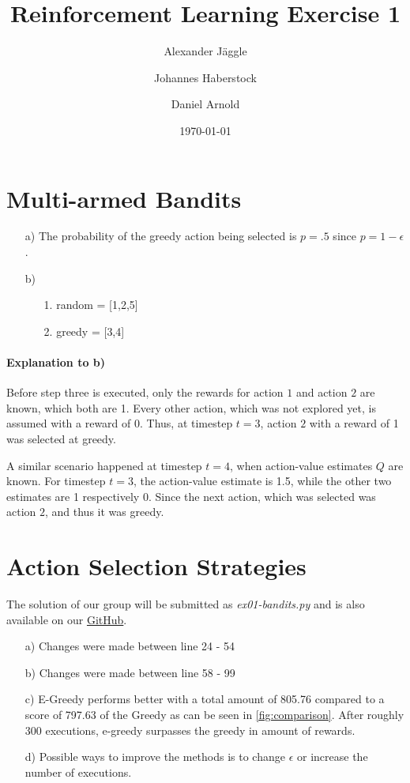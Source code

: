 \documentclass{article}
\title{Reinforcement Learning Exercise 1}
\author{Alexander J\"aggle}
\author{Johannes Haberstock}
\author{Daniel Arnold}
\affil{M.Sc. Autonomous Systems, University of Stuttgart}
\date{\today}
\begin{document}
\maketitle

\section{Multi-armed Bandits}

\begin{itemize}
    \item[a)] The probability of the greedy action being selected is $p = .5$ since $p = 1- \epsilon$.   
    \item[b)] {
    \begin{itemize}
        \item[1.] random = [{1,2,5}]
        \item[2.] greedy = [{3,4}]
    \end{itemize}
    }
\end{itemize}


\paragraph{Explanation to b)}
Before step three is executed, only the rewards for action $1$ and action $2$ are known, which both are 1. 
Every other action, which was not explored yet, is assumed with a reward of 0. Thus, at timestep $t = 3$, 
action $2$ with a reward of 1 was selected at greedy. 

A similar scenario happened at timestep $t = 4$, when action-value estimates $Q$ are known. For timestep $t = 3$,
the action-value estimate is 1.5, while the other two estimates are 1 respectively 0. Since the next action, which
was selected was action $2$, and thus it was greedy. 

\section{Action Selection Strategies}
The solution of our group will be submitted as \textit{ex01-bandits.py} and is also available on our 
\href{https://github.com/DesmoAlex/ReinforcementLearning_UniStgt/tree/master/ex01-bandits}{GitHub}.

\begin{itemize}
    \item[a)] Changes were made between line 24 - 54 
    \item[b)] Changes were made between line 58 - 99
    \item[c)] E-Greedy performs better with a total amount of 805.76 compared to a score of 797.63
                of the Greedy as can be seen in \cref{fig:comparison}. After roughly 300 executions, e-greedy surpasses the greedy in amount of
                rewards.   
                \item[d)] Possible ways to improve the methods is to change $\epsilon$ or increase the number of executions.
\end{itemize}
            
\end{document}
